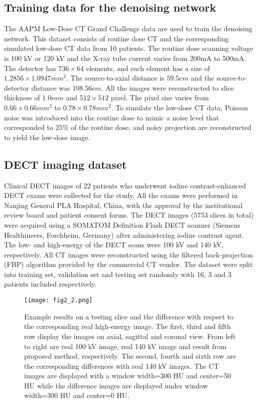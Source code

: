 \documentclass[journal,twoside,web]{ieeecolor}
\begin{document}
\subsection{Training data for the denoising network}
The AAPM Low-Dose CT Grand Challenge data are used to train the denoising network. This dataset consists of routine dose CT and the corresponding simulated low-dose CT data from 10 patients. The routine dose scanning voltage is 100 kV or 120 kV and the X-ray tube current varies from 200mA to 500mA. The detector has \(736\times64\) elements, and each element has a size of \(1.2856\times1.0947mm^2\). The source-to-axial distance is \(59.5cm\) and the source-to-detector distance was \(108.56cm\). All the images were reconstructed to slice thickness of \(1.0 mm\) and \(512\times512\) pixel. The pixel size varies from \(0.66\times0.66mm^2\) to \(0.78\times0.78mm^2\). To simulate the low-dose CT data, Poisson noise was introduced into the routine dose to mimic a noise level that corresponded to \(25\%\) of the routine dose, and noisy projection are reconstructed to yield the low-dose image.  %

\subsection{DECT imaging dataset}
Clinical DECT images of 22 patients who underwent iodine contrast-enhanced DECT exams were collected for the study. All the exams were performed in Nanjing General PLA Hospital, China, with the approval by the institutional review board and patient consent forms. The DECT images (5753 slices in total) were acquired using a SOMATOM Definition Flash DECT scanner (Siemens Healthineers, Forchheim, Germany) after administering iodine contrast agent. The low- and high-energy of the DECT scans were 100 kV and 140 kV, respectively. All CT images were reconstructed using the filtered back-projection (FBP) algorithm provided by the commercial CT vendor. The dataset were split into training set, validation set and testing set randomly with 16, 3 and 3 patients included respectively.

\begin{figure}[t]%
    \centering
        \texttt{[image: fig2\_2.png]}
        \caption{Example results on a testing slice and the difference with respect to the corresponding real high-energy image. The first, third and fifth row display the images on axial, sagittal and coronal view. From left to right are real 100 kV image, real 140 kV image and result from proposed method, respectively. The second, fourth and sixth row are the corresponding differences with real 140 kV images. The CT images are displayed with a window width=300 HU and center=50 HU while the difference images are displayed under window width=300 HU and center=0 HU.}
    \label{fig:5}
\end{figure}
\end{document}
